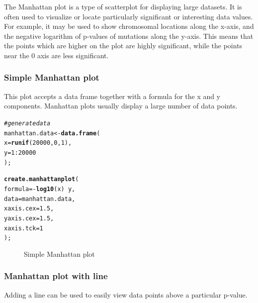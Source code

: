 \documentclass[letterpaper]{report}\usepackage[]{graphicx}\usepackage[]{color}
\makeatletter
\newcommand{\hlnum}[1]{\textcolor[rgb]{0.686,0.059,0.569}{#1}}%
\newcommand{\hlcom}[1]{\textcolor[rgb]{0.678,0.584,0.686}{\textit{#1}}}%
\newcommand{\hlopt}[1]{\textcolor[rgb]{0,0,0}{#1}}%
\newcommand{\hlstd}[1]{\textcolor[rgb]{0.345,0.345,0.345}{#1}}%
\newcommand{\hlkwb}[1]{\textcolor[rgb]{0.69,0.353,0.396}{#1}}%
\newcommand{\hlkwc}[1]{\textcolor[rgb]{0.333,0.667,0.333}{#1}}%
\newcommand{\hlkwd}[1]{\textcolor[rgb]{0.737,0.353,0.396}{\textbf{#1}}}%
\newenvironment{kframe}{%
 \def\at@end@of@kframe{}%
 \ifinner\ifhmode%
  \def\at@end@of@kframe{\end{minipage}}%
  \begin{minipage}{\columnwidth}%
 \fi\fi%
 \def\FrameCommand##1{\hskip\@totalleftmargin \hskip-\fboxsep
 \colorbox{shadecolor}{##1}\hskip-\fboxsep
     \hskip-\linewidth \hskip-\@totalleftmargin \hskip\columnwidth}%
 \MakeFramed {\advance\hsize-\width
   \@totalleftmargin\z@ \linewidth\hsize
   \@setminipage}}%
 {\par\unskip\endMakeFramed%
 \at@end@of@kframe}
\newenvironment{knitrout}{}{} %
\makeatother
\begin{document}
The Manhattan plot is a type of scatterplot for displaying large datasets. It is often used to visualize or locate particularly significant or interesting data values. For example, it may be used to show chromosomal locations along the x-axis, and the negative logarithm of p-values of mutations along the y-axis. This means that the points which are higher on the plot are highly significant, while the points near the 0 axis are less significant.

\subsubsection{Simple Manhattan plot}
This plot accepts a data frame together with a formula for the x and y components. Manhattan plots usually display a large number of data points.

\begin{knitrout}
\color{fgcolor}\begin{kframe}
\begin{alltt}
\hlcom{# generate data}
\hlstd{manhattan.data} \hlkwb{<-} \hlkwd{data.frame}\hlstd{(}
    \hlkwc{x} \hlstd{=} \hlkwd{runif}\hlstd{(}\hlnum{20000}\hlstd{,} \hlnum{0}\hlstd{,} \hlnum{1}\hlstd{),}
    \hlkwc{y} \hlstd{=} \hlnum{1}\hlopt{:}\hlnum{20000}
    \hlstd{);}

\hlkwd{create.manhattanplot}\hlstd{(}
    \hlkwc{formula} \hlstd{=} \hlopt{-}\hlkwd{log10}\hlstd{(x)} \hlopt{~} \hlstd{y,}
    \hlkwc{data} \hlstd{= manhattan.data,}
    \hlkwc{xaxis.cex} \hlstd{=} \hlnum{1.5}\hlstd{,}
    \hlkwc{yaxis.cex} \hlstd{=} \hlnum{1.5}     \hlstd{,}
    \hlkwc{xaxis.tck} \hlstd{=} \hlnum{1}
    \hlstd{);}
\end{alltt}
\end{kframe}\begin{figure}

{\centering {} 

}

\caption[Simple Manhattan plot]{Simple Manhattan plot\label{fig:manhattan1}}
\end{figure}


\end{knitrout}

\subsubsection{Manhattan plot with line}
Adding a line can be used to easily view data points above a particular p-value.
\end{document}
